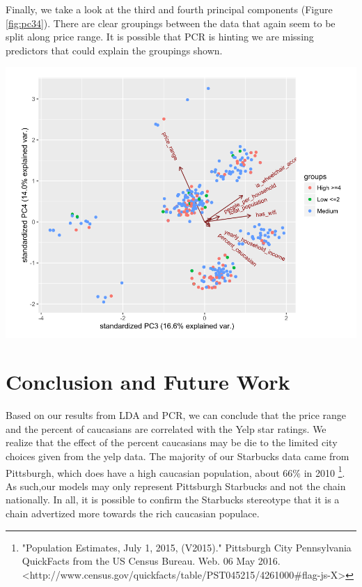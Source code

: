 \documentclass{article}
\newenvironment{Figure}
  {\par\medskip\noindent\minipage{\linewidth}}
  {\endminipage\par\medskip}
\begin{document}
\begin{multicols}{2}
Finally, we take a look at the third and fourth principal components (Figure \ref{fig:pc34}). There are clear groupings between the data that again seem to be split along price range. It is possible that PCR is hinting we are missing predictors that could explain the groupings shown.

\begin{Figure}
\centering
   \includegraphics[width=\linewidth]{pc34}
	\label{fig:pc34}
\end{Figure}

\section{Conclusion and Future Work}

Based on our results from LDA and PCR, we can conclude that the price range and the percent of caucasians are correlated with the Yelp star ratings. We realize that the effect of the percent caucasians may be die to the limited city choices given from the yelp data. The majority of our Starbucks data came from Pittsburgh, which does have a high caucasian population, about 66\% in 2010 \footnote{\label{footnote1} "Population Estimates, July 1, 2015, (V2015)." Pittsburgh City Pennsylvania QuickFacts from the US Census Bureau. Web. 06 May 2016. <http://www.census.gov/quickfacts/table/PST045215/4261000\#flag-js-X>}. As such,our models may only represent Pittsburgh Starbucks and not the chain nationally. In all, it is possible to confirm the Starbucks stereotype that it is a chain advertized more towards the rich caucasian populace. 


\end{multicols}
\end{document}
